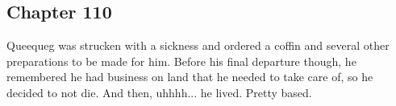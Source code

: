 \subsection{Chapter 110}

Queequeg was strucken with a sickness and ordered a coffin and several other preparations to be made for him. Before his final departure though, he remembered he had business on land that he needed to take care of, so he decided to not die. And then, uhhhh... he lived. Pretty based.
